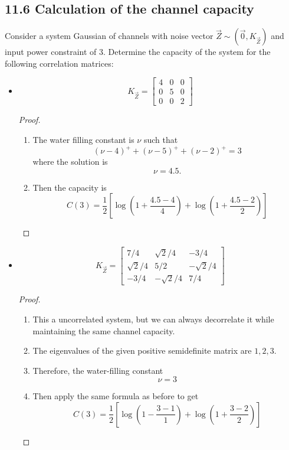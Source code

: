 \documentclass[../main.tex]{subfiles}
\begin{document}
\subsection*{11.6 Calculation of the channel capacity}
Consider a system Gaussian of channels with noise vector $\vec Z\sim (\vec 0, K_{\vec Z})$ and input power constraint of $3$. Determine the capacity of the system for the following correlation matrices:
\begin{itemize}
    \item \[
    K_{\vec Z}=\begin{bmatrix}
        4 & 0 & 0\\
        0 & 5 & 0\\
        0 & 0 & 2
    \end{bmatrix}
    \]
    \begin{proof}
        \begin{enumerate}
            \item The water filling constant is $\nu$ such that \[
            (\nu - 4)^+ +(\nu-5)^+ +(\nu-2)^+ =3
            \] where the solution is \[
            \nu = 4.5.
            \]
            \item Then the capacity is \[
            C(3) = \frac{1}{2}\left[\log\left(1+\frac{4.5-4}{4}\right) + \log\left(1+\frac{4.5-2}{2}\right)\right]
            \]
        \end{enumerate}
    \end{proof}
    \item \[
    K_{\vec Z} = \begin{bmatrix}
        7/4 & \sqrt{2}/4 & -3/4\\
        \sqrt{2}/4 & 5/2 & -\sqrt{2}/4 \\
        -3/4 & -\sqrt{2}/4 & 7/4
    \end{bmatrix}
    \]
    \begin{proof}
        \begin{enumerate}
            \item This a uncorrelated system, but we can always decorrelate it while maintaining the same channel capacity.
            \item The eigenvalues of the given positive semidefinite matrix are $1,2,3$.
            \item Therefore, the water-filling constant \[
            \nu = 3
            \]
            \item Then apply the same formula as before to get \[
            C(3) = \frac{1}{2}\left[\log(1-\frac{3-1}{1}) + \log(1+\frac{3-2}{2})\right]
            \]
        \end{enumerate}
    \end{proof}
    \end{itemize}
\end{document}
